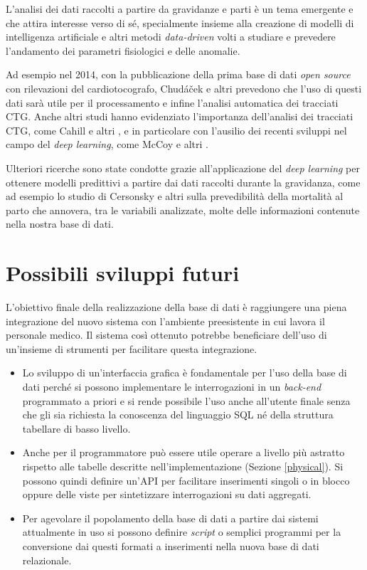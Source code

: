 L'analisi dei dati raccolti a partire da gravidanze e parti è un tema emergente e che attira interesse verso di sé, specialmente insieme alla creazione di modelli di intelligenza artificiale e altri metodi \emph{data-driven} volti a studiare e prevedere l'andamento dei parametri fisiologici e delle anomalie.

Ad esempio nel 2014, con la pubblicazione della prima base di dati \emph{open source} con rilevazioni del cardiotocografo, Chudáček e altri \cite{Chu14} prevedono che l'uso di questi dati sarà utile per il processamento e infine l'analisi automatica dei tracciati CTG.
Anche altri studi hanno evidenziato l'importanza dell'analisi dei tracciati CTG, come Cahill e altri \cite{Cah18}, e in particolare con l'ausilio dei recenti sviluppi nel campo del \emph{deep learning}, come McCoy e altri \cite{McC25}.

Ulteriori ricerche sono state condotte grazie all'applicazione del \emph{deep learning} per ottenere modelli predittivi a partire dai dati raccolti durante la gravidanza, come ad esempio lo studio di Cersonsky e altri \cite{Cer23} sulla prevedibilità della mortalità al parto che annovera, tra le variabili analizzate, molte delle informazioni contenute nella nostra base di dati.

\section{Possibili sviluppi futuri}

L'obiettivo finale della realizzazione della base di dati è raggiungere una piena integrazione del nuovo sistema con l'ambiente preesistente in cui lavora il personale medico.
Il sistema così ottenuto potrebbe beneficiare dell'uso di un'insieme di strumenti per facilitare questa integrazione.
\begin{itemize}
\item Lo sviluppo di un'interfaccia grafica è fondamentale per l'uso della base di dati perché si possono implementare le interrogazioni in un \emph{back-end} programmato a priori e si rende possibile l'uso anche all'utente finale senza che gli sia richiesta la conoscenza del linguaggio SQL né della struttura tabellare di basso livello.
\item Anche per il programmatore può essere utile operare a livello più astratto rispetto alle tabelle descritte nell'implementazione (Sezione \ref{physical}). Si possono quindi definire un'API per facilitare inserimenti singoli o in blocco oppure delle viste per sintetizzare interrogazioni su dati aggregati. 
\item Per agevolare il popolamento della base di dati a partire dai sistemi attualmente in uso si possono definire \emph{script} o semplici programmi per la conversione dai questi formati a inserimenti nella nuova base di dati relazionale.
\end{itemize}